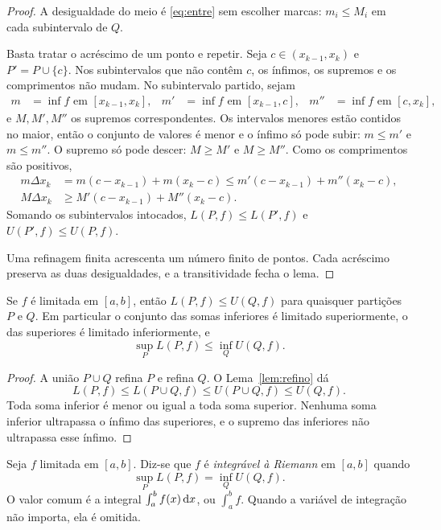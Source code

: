 \documentclass[11pt,a4paper]{article}
\begin{document}
\begin{proof}
A desigualdade do meio é \eqref{eq:entre} sem escolher marcas: $m_i\le M_i$ em cada subintervalo de $Q$.

Basta tratar o acréscimo de um ponto e repetir. Seja $c\in(x_{k-1},x_k)$ e $P'=P\cup\{c\}$. Nos subintervalos que não contêm $c$, os ínfimos, os supremos e os comprimentos não mudam. No subintervalo partido, sejam
\begin{align*}
m&=\inf f\text{ em }[x_{k-1},x_k],&
m'&=\inf f\text{ em }[x_{k-1},c],&
m''&=\inf f\text{ em }[c,x_k],
\end{align*}
e $M,M',M''$ os supremos correspondentes. Os intervalos menores estão contidos no maior, então o conjunto de valores é menor e o ínfimo só pode subir: $m\le m'$ e $m\le m''$. O supremo só pode descer: $M\ge M'$ e $M\ge M''$. Como os comprimentos são positivos,
\begin{align*}
m\Delta x_k
&=m(c-x_{k-1})+m(x_k-c)
\le m'(c-x_{k-1})+m''(x_k-c),\\
M\Delta x_k
&\ge M'(c-x_{k-1})+M''(x_k-c).
\end{align*}
Somando os subintervalos intocados, $L(P,f)\le L(P',f)$ e $U(P',f)\le U(P,f)$.

Uma refinagem finita acrescenta um número finito de pontos. Cada acréscimo preserva as duas desigualdades, e a transitividade fecha o lema.
\end{proof}

\begin{lema}\label{lem:separa}
Se $f$ é limitada em $[a,b]$, então $L(P,f)\le U(Q,f)$ para quaisquer partições $P$ e $Q$. Em particular o conjunto das somas inferiores é limitado superiormente, o das superiores é limitado inferiormente, e
\[
\sup_P L(P,f)\le\inf_Q U(Q,f).
\]
\end{lema}

\begin{proof}
A união $P\cup Q$ refina $P$ e refina $Q$. O Lema~\ref{lem:refino} dá
\[
L(P,f)\le L(P\cup Q,f)\le U(P\cup Q,f)\le U(Q,f).
\]
Toda soma inferior é menor ou igual a toda soma superior. Nenhuma soma inferior ultrapassa o ínfimo das superiores, e o supremo das inferiores não ultrapassa esse ínfimo.
\end{proof}

\begin{definicao}
Seja $f$ limitada em $[a,b]$. Diz-se que $f$ é \emph{integrável à Riemann} em $[a,b]$ quando
\[
\sup_P L(P,f)=\inf_Q U(Q,f).
\]
O valor comum é a integral $\int_a^b f(x)\,\mathrm{d} x$, ou $\int_a^b f$. Quando a variável de integração não importa, ela é omitida.
\end{definicao}
\end{document}
